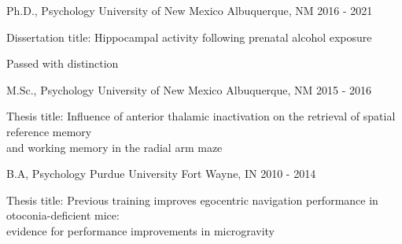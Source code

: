 

\begin{cventries}
  \cventry
    {Ph.D., Psychology} %
    {University of New Mexico} %
    {Albuquerque, NM} %
    {2016 - 2021} %
    {
    \begin{cvitems} %
        \item {Dissertation title: Hippocampal activity following prenatal alcohol exposure}
        \item {Passed with distinction}
    \end{cvitems}
    }   
    
  \cventry
    {M.Sc., Psychology} %
    {University of New Mexico} %
    {Albuquerque, NM} %
    {2015 - 2016} %
    {
    \begin{cvitems} %
        \item {Thesis title: Influence of anterior thalamic inactivation on the retrieval of spatial reference memory \\ and working memory in the radial arm maze}
    \end{cvitems}
    }   
    
  \cventry
    {B.A, Psychology} %
    {Purdue University} %
    {Fort Wayne, IN} %
    {2010 - 2014} %
    {
    \begin{cvitems} %
        \item {Thesis title: Previous training improves egocentric navigation performance in otoconia-deficient mice: \\ evidence for performance improvements in microgravity}
    \end{cvitems}
    }    
\end{cventries}